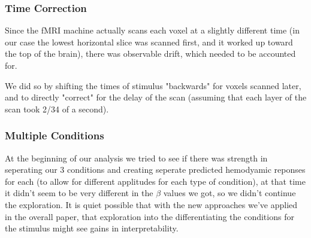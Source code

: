 \subsubsection{Time Correction}

Since the fMRI machine actually scans each voxel at a slightly different time (in our case the lowest horizontal slice was scanned first, and it worked up toward the top of the brain), there was observable drift, which needed to be accounted for.

We did so by shifting the times of stimulus "backwards" for voxels scanned later, and to directly "correct" for the delay of the scan (assuming that each layer of the scan took 2/34 of a second).

\subsubsection{Multiple Conditions}
At the beginning of our analysis we tried to see if there was strength in 
seperating our 3 conditions and creating seperate predicted hemodyamic reponses 
for each (to allow for different applitudes for each type of condition), at 
that time it didn't seem to be very different in the $\beta$ values we got, so 
we didn't continue the exploration. It is quiet possible that with the new 
approaches we've applied in the overall paper, that exploration into the 
differentiating the conditions for the stimulus might see gains in 
interpretability.


